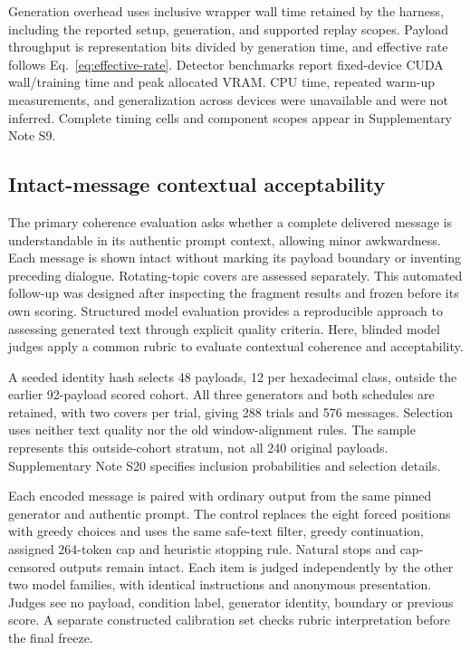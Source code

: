 \documentclass[fleqn,10pt]{wlscirep}
\begin{document}
Generation overhead uses inclusive wrapper wall time retained by the harness, including the reported setup, generation, and supported replay scopes. Payload throughput is representation bits divided by generation time, and effective rate follows Eq.~\eqref{eq:effective-rate}. Detector benchmarks report fixed-device CUDA wall/training time and peak allocated VRAM. CPU time, repeated warm-up measurements, and generalization across devices were unavailable and were not inferred. Complete timing cells and component scopes appear in Supplementary Note S9.




\subsection*{Intact-message contextual acceptability}\label{sec:v4-contextual-method}\label{sec:v4-boundary-method}
The primary coherence evaluation asks whether a complete delivered message is understandable in its authentic prompt context, allowing minor awkwardness. Each message is shown intact without marking its payload boundary or inventing preceding dialogue. Rotating-topic covers are assessed separately. This automated follow-up was designed after inspecting the fragment results and frozen before its own scoring. Structured model evaluation provides a reproducible approach to assessing generated text through explicit quality criteria\cite{Liu2023GEval}. Here, blinded model judges apply a common rubric to evaluate contextual coherence and acceptability.

A seeded identity hash selects 48 payloads, 12 per hexadecimal class, outside the earlier 92-payload scored cohort. All three generators and both schedules are retained, with two covers per trial, giving 288 trials and 576 messages. Selection uses neither text quality nor the old window-alignment rules. The sample represents this outside-cohort stratum, not all 240 original payloads. Supplementary Note S20 specifies inclusion probabilities and selection details.

Each encoded message is paired with ordinary output from the same pinned generator and authentic prompt. The control replaces the eight forced positions with greedy choices and uses the same safe-text filter, greedy continuation, assigned 264-token cap and heuristic stopping rule. Natural stops and cap-censored outputs remain intact. Each item is judged independently by the other two model families, with identical instructions and anonymous presentation. Judges see no payload, condition label, generator identity, boundary or previous score. A separate constructed calibration set checks rubric interpretation before the final freeze.
\end{document}

